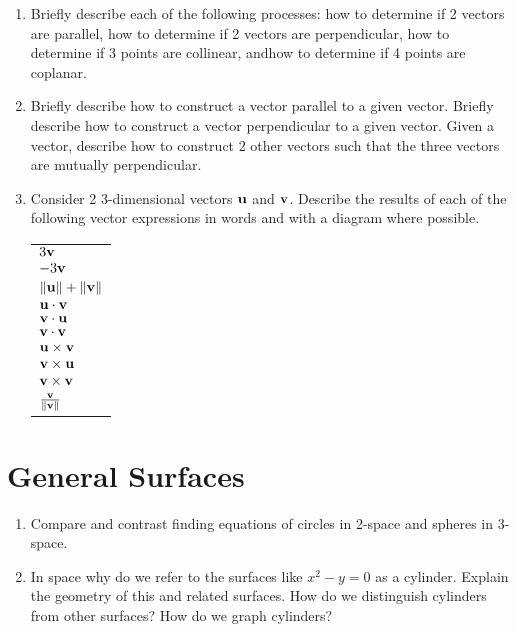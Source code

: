 \begin{enumerate}
 \item Briefly describe each of the following processes:  how to determine if 2 vectors are parallel, how to determine if 2 vectors are perpendicular, how to determine if 3 points are collinear, andhow to determine if 4 points are coplanar.  \cite{SM}
 \item Briefly describe how to construct a vector parallel to a given vector.  Briefly describe how to construct a vector perpendicular to a given vector.  Given a vector, describe how to construct 2 other vectors such that the three vectors are mutually perpendicular.  \cite{SM}
 
 \item Consider 2 3-dimensional vectors $\bf{u}$ and $\bf{v}$.  Describe the results of each of the following vector expressions in words and with a diagram where possible.
 
 \begin{center}
 \begin{tabular}{l}
 $3\bf{v}$\\ 
 $-3\bf{v}$\\
 
  $\left\| \bf{u}\right\| + \left\| \bf{v}\right\|$\\ 
  $\bf{u} \cdot \bf{v}$\\
  $\bf{v} \cdot \bf{u}$\\
  $\bf{v} \cdot \bf{v}$\\
 $\bf{u} \times \bf{v}$\\
 $\bf{v} \times \bf{u}$\\
  $\bf{v} \times \bf{v}$\\
	${{\bf{v}} \over \left\| {\bf{v}} \right\|}$\\ 
  \end{tabular} 
 \end{center}
 

\end{enumerate}

\section{General Surfaces}

\begin{enumerate}

 \item Compare and contrast finding equations of circles in 2-space and spheres in 3-space.
 \item In space why do we refer to the surfaces like $x^2 - y = 0$ as a cylinder.  Explain the geometry of this and related surfaces.  How do we distinguish cylinders from other surfaces?  How do we graph cylinders?
\end{enumerate}
